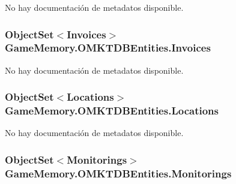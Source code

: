 No hay documentación de metadatos disponible. 

\hypertarget{class_game_memory_1_1_o_m_k_t_d_b_entities_a5f476d54b5516d130b85937f55d63fbd}{
\subsubsection[{Invoices}]{\setlength{\rightskip}{0pt plus 5cm}Object\-Set$<${\bf Invoices}$>$ Game\-Memory.\-O\-M\-K\-T\-D\-B\-Entities.\-Invoices\hspace{0.3cm}{\ttfamily [get]}}}\label{class_game_memory_1_1_o_m_k_t_d_b_entities_a5f476d54b5516d130b85937f55d63fbd}


No hay documentación de metadatos disponible. 

\hypertarget{class_game_memory_1_1_o_m_k_t_d_b_entities_a4b8ec3058d7f5a515cf9bc9681f1191a}{
\subsubsection[{Locations}]{\setlength{\rightskip}{0pt plus 5cm}Object\-Set$<${\bf Locations}$>$ Game\-Memory.\-O\-M\-K\-T\-D\-B\-Entities.\-Locations\hspace{0.3cm}{\ttfamily [get]}}}\label{class_game_memory_1_1_o_m_k_t_d_b_entities_a4b8ec3058d7f5a515cf9bc9681f1191a}


No hay documentación de metadatos disponible. 

\hypertarget{class_game_memory_1_1_o_m_k_t_d_b_entities_a003abae33bc7aceca33711191c9d20a3}{
\subsubsection[{Monitorings}]{\setlength{\rightskip}{0pt plus 5cm}Object\-Set$<${\bf Monitorings}$>$ Game\-Memory.\-O\-M\-K\-T\-D\-B\-Entities.\-Monitorings\hspace{0.3cm}{\ttfamily [get]}}}\label{class_game_memory_1_1_o_m_k_t_d_b_entities_a003abae33bc7aceca33711191c9d20a3}


